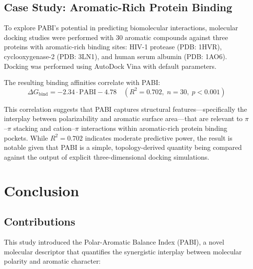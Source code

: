 \documentclass[12pt,a4paper]{article}
\begin{document}
\subsection{Case Study: Aromatic-Rich Protein Binding}

To explore PABI's potential in predicting biomolecular interactions, molecular docking studies were performed with 30 aromatic compounds against three proteins with aromatic-rich binding sites: HIV-1 protease (PDB: 1HVR), cyclooxygenase-2 (PDB: 3LN1), and human serum albumin (PDB: 1AO6). Docking was performed using AutoDock Vina\cite{trott2010autodock} with default parameters.

The resulting binding affinities correlate with PABI:
\begin{equation}
\label{eq:binding}
\Delta G_{\text{bind}} = -2.34 \cdot \text{PABI} - 4.78 \quad (R^2 = 0.702,\; n = 30,\; p < 0.001)
\end{equation}

This correlation suggests that PABI captures structural features---specifically the interplay between polarizability and aromatic surface area---that are relevant to $\pi$--$\pi$ stacking and cation--$\pi$ interactions within aromatic-rich protein binding pockets. While $R^2 = 0.702$ indicates moderate predictive power, the result is notable given that PABI is a simple, topology-derived quantity being compared against the output of explicit three-dimensional docking simulations.

\section{Conclusion}
\label{sec:conclusion}

\subsection{Contributions}

This study introduced the Polar-Aromatic Balance Index (PABI), a novel molecular descriptor that quantifies the synergistic interplay between molecular polarity and aromatic character:
\end{document}

